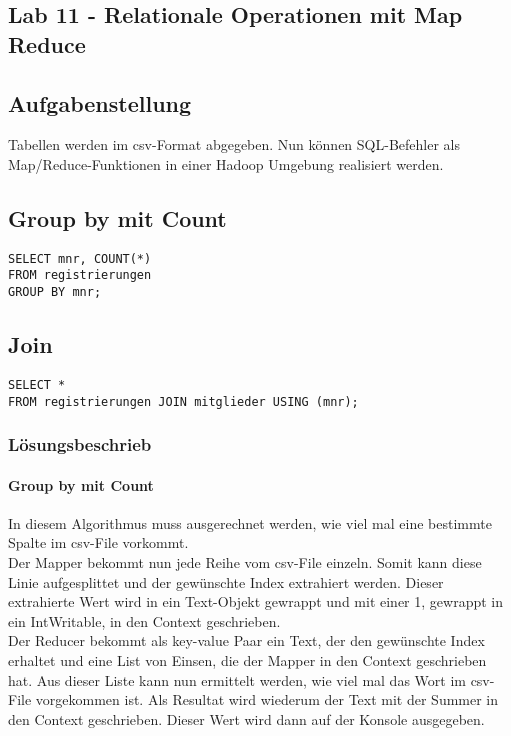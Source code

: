 \documentclass[a4paper,10pt,titlepage=false]{scrreprt}
\begin{document}
\begin{itemize}

\chapter{Lab 11 - Relationale Operationen mit Map Reduce}
\section{Aufgabenstellung}
Tabellen werden im csv-Format abgegeben. Nun können SQL-Befehler als Map/Reduce-Funktionen in einer Hadoop Umgebung realisiert werden.
\section{Group by mit Count}
\begin{lstlisting}[style=sql]
SELECT mnr, COUNT(*)
FROM registrierungen
GROUP BY mnr;
\end{lstlisting}

\section{Join}
\begin{lstlisting}[style=sql]
SELECT *
FROM registrierungen JOIN mitglieder USING (mnr);
\end{lstlisting}


\subsection{Lösungsbeschrieb}
\subsubsection{Group by mit Count}
In diesem Algorithmus muss ausgerechnet werden, wie viel mal eine bestimmte Spalte im csv-File vorkommt.\\
Der Mapper bekommt nun jede Reihe vom csv-File einzeln. Somit kann diese Linie aufgesplittet und der gewünschte Index extrahiert werden. Dieser extrahierte Wert wird in ein Text-Objekt gewrappt und mit einer 1, gewrappt in ein IntWritable, in den Context geschrieben.\\
Der Reducer bekommt als key-value Paar ein Text, der den gewünschte Index erhaltet und eine List von Einsen, die der Mapper in den Context geschrieben hat. Aus dieser Liste kann nun ermittelt werden, wie viel mal das Wort im csv-File vorgekommen ist. Als Resultat wird wiederum der Text mit der Summer in den Context geschrieben. Dieser Wert wird dann auf der Konsole ausgegeben.

\end{itemize}
\end{document}
